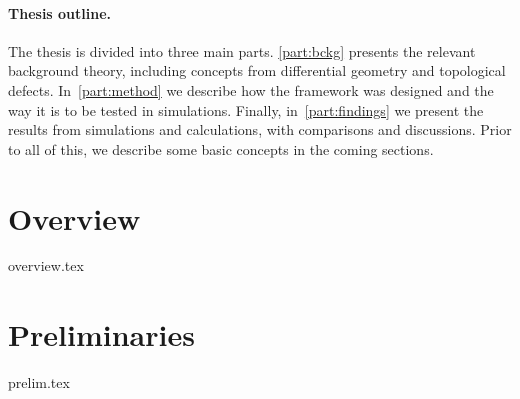 




\paragraph{Thesis outline.} %
{%
The thesis is divided into three main parts. %
\cref{part:bckg} presents the relevant background theory, including concepts from differential geometry and topological defects. %
In~\cref{part:method} we describe how the framework was designed and the way it is to be tested in simulations. %
Finally, in~\cref{part:findings} we present the results from simulations and calculations, with comparisons and discussions. %
Prior to all of this, we describe some basic concepts in the coming sections.}










\section{Overview}\label{sec:intro:overview}
    {{overview.tex}}






    
    



\section{Preliminaries}\label{sec:intro:prelim}
    {{prelim.tex}}




